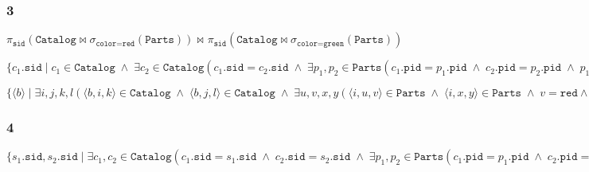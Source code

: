 \subsubsection*{3}

$\pi_{\mathtt{sid}}(\texttt{Catalog} \bowtie \sigma_{\texttt{color} = \texttt{red}}(\texttt{Parts})) 
\bowtie_{} 
\pi_{\mathtt{sid}}(\texttt{Catalog} \bowtie \sigma_{\texttt{color} = \texttt{green}}(\texttt{Parts}))$

\hspace{20px}

$\{c_1.\mathtt{sid} \; | \; c_1 \in \mathtt{Catalog} \; \wedge \; \exists c_2 \in \mathtt{Catalog}(c_1.\mathtt{sid} = c_2.\mathtt{sid} \; \wedge \; \exists p_1,p_2 \in \mathtt{Parts}(c_1.\mathtt{pid} = p_1.\mathtt{pid} \; \wedge \; c_2.\mathtt{pid} = p_2.\mathtt{pid} \; \wedge \; p_1.\mathtt{color} = \mathtt{red} \; \wedge \; p_2.\mathtt{color} = \mathtt{green}))\}$
 
\hspace{20px}

$\{\langle b \rangle  \; | \; \exists i,j,k,l(\langle b,i,k \rangle  \in \mathtt{Catalog} \; \wedge \; 
\langle b,j,l \rangle  \in \mathtt{Catalog} \; \wedge \;
\exists u, v, x, y(\langle i, u, v \rangle  \in \mathtt{Parts} \; \wedge \; \langle i, x, y \rangle  \in \mathtt{Parts} \; \wedge \; 
v = \mathtt{red} \wedge y = \mathtt{green}))
))$ 

\subsubsection*{4}

$\{s_1.\mathtt{sid}, s_2.\mathtt{sid} \; | \; \exists c_1, c_2 \in \mathtt{Catalog}
(
  c_1.\mathtt{sid} = s_1.\mathtt{sid} \; \wedge \; c_2.\mathtt{sid} = s_2.\mathtt{sid} \; \wedge \; \exists p_1, p_2 \in \mathtt{Parts}
  (
    c_1.\mathtt{pid} = p_1.\mathtt{pid} \; \wedge \; c_2.\mathtt{pid} = p_2.\mathtt{pid} \; \wedge \; p_1.\mathtt{cost} > p_2.\mathtt{cost}
  )
)\}$
 
